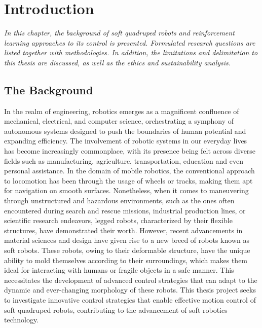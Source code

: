 \chapter{Introduction}
\label{chap1}
\textit{In this chapter, the background of soft quadruped robots and reinforcement learning approaches to its control is presented. Formulated research questions are listed together with methodologies. In addition, the limitations and delimitation to this thesis are discussed, as well as the ethics and sustainability analysis.}

\section{The Background}
In the realm of engineering, robotics emerges as a magnificent confluence of mechanical, electrical, and computer science, orchestrating a symphony of autonomous systems designed to push the boundaries of human potential and expanding efficiency\cite{billardTrendsChallengesRobot2019}. The involvement of robotic systems in our everyday lives has become increasingly commonplace, with its presence being felt across diverse fields such as manufacturing\cite{wangCurrentResearchesFuture2018}, agriculture\cite{liDevelopmentFieldEvaluation2023}, transportation\cite{zhangFindingCriticalScenarios2023}, education\cite{riedoThymioIIRobot2013} and even personal assistance\cite{openaiGPT4TechnicalReport2023}. In the domain of mobile robotics, the conventional approach to locomotion has been through the usage of wheels or tracks, making them apt for navigation on smooth surfaces\cite{liResearchMammalBionic2011}. Nonetheless, when it comes to maneuvering through unstructured and hazardous environments, such as the ones often encountered during search and rescue missions\cite{hawkesSoftRobotThat2017}, industrial production lines\cite{huDesignQuadrupedInspection2021}, or scientific research endeavors\cite{hewingLearningbasedModelPredictive2020}, legged robots, characterized by their flexible structures, have demonstrated their worth. However, recent advancements in material sciences and design have given rise to a new breed of robots known as soft robots. These robots, owing to their deformable structure, have the unique ability to mold themselves according to their surroundings, which makes them ideal for interacting with humans or fragile objects in a safe manner\cite{muralidharanSoftQuadrupedRobot2021}. This necessitates the development of advanced control strategies that can adapt to the dynamic and ever-changing morphology of these robots\cite{wangControlStrategiesSoft2022}. This thesis project seeks to investigate innovative control strategies that enable effective motion control of soft quadruped robots, contributing to the advancement of soft robotics technology.

